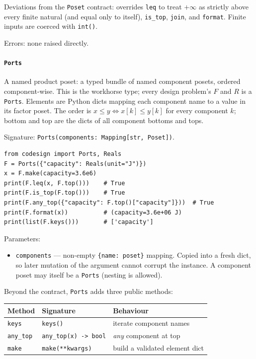 \documentclass[11pt,a4paper]{article}
\begin{document}
Deviations from the \texttt{Poset} contract: overrides \texttt{leq} to
treat $+\infty$ as strictly above every finite natural (and equal only to
itself), \texttt{is\_top}, \texttt{join}, and \texttt{format}. Finite
inputs are coerced with \texttt{int()}.

Errors: none raised directly.

\paragraph{\texttt{Ports}}
\label{ref:posets:ports}
A named product poset: a typed bundle of named component posets, ordered
component-wise. This is the workhorse type; every design problem's $F$ and
$R$ is a \texttt{Ports}. Elements are Python dicts mapping each component
name to a value in its factor poset. The order is
$x \leq y \iff x[k] \leq y[k]$ for every component $k$; bottom and top are
the dicts of all component bottoms and tops.

Signature: \texttt{Ports(components: Mapping[str, Poset])}.

\begin{lstlisting}
from codesign import Ports, Reals
F = Ports({"capacity": Reals(unit="J")})
x = F.make(capacity=3.6e6)
print(F.leq(x, F.top()))    # True
print(F.is_top(F.top()))    # True
print(F.any_top({"capacity": F.top()["capacity"]}))  # True
print(F.format(x))          # (capacity=3.6e+06 J)
print(list(F.keys()))       # ['capacity']
\end{lstlisting}

Parameters:
\begin{itemize}[nosep]
\item \texttt{components} --- non-empty \texttt{\{name: poset\}} mapping.
  Copied into a fresh dict, so later mutation of the argument cannot
  corrupt the instance. A component poset may itself be a \texttt{Ports}
  (nesting is allowed).
\end{itemize}

Beyond the contract, \texttt{Ports} adds three public methods:

\begin{center}
\begin{tabular}{@{}lll@{}}
\toprule
Method & Signature & Behaviour \\
\midrule
\texttt{keys}    & \texttt{keys()}            & iterate component names \\
\texttt{any\_top}& \texttt{any\_top(x) -> bool}& \emph{any} component at top \\
\texttt{make}    & \texttt{make(**kwargs)}    & build a validated element dict \\
\bottomrule
\end{tabular}
\end{center}
\end{document}
